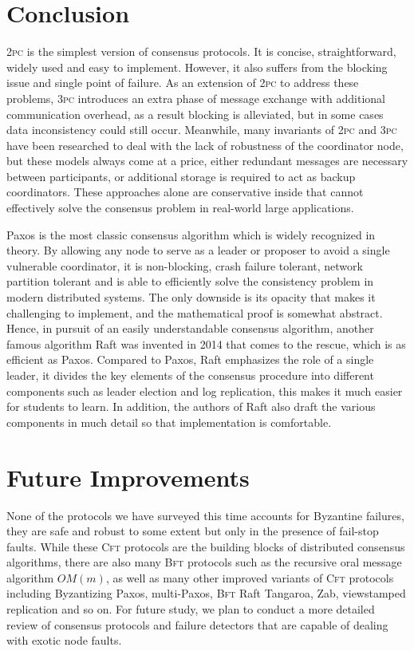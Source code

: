 \documentclass[11pt]{article}
\begin{document}
  \section{Conclusion}
    \textsc{2pc} is the simplest version of consensus protocols. It is concise, straightforward, widely used and easy to implement. However, it also suffers from the blocking issue and single point of failure. As an extension of \textsc{2pc} to address these problems, \textsc{3pc} introduces an extra phase of message exchange with additional communication overhead, as a result blocking is alleviated, but in some cases data inconsistency could still occur. Meanwhile, many invariants of \textsc{2pc} and \textsc{3pc} have been researched to deal with the lack of robustness of the coordinator node, but these models always come at a price, either redundant messages are necessary between participants, or additional storage is required to act as backup coordinators. These approaches alone are conservative inside that cannot effectively solve the consensus problem in real-world large applications.

    Paxos is the most classic consensus algorithm which is widely recognized in theory. By allowing any node to serve as a leader or proposer to avoid a single vulnerable coordinator, it is non-blocking, crash failure tolerant, network partition tolerant and is able to efficiently solve the consistency problem in modern distributed systems. The only downside is its opacity that makes it challenging to implement, and the mathematical proof is somewhat abstract. Hence, in pursuit of an easily understandable consensus algorithm, another famous algorithm Raft was invented in 2014 that comes to the rescue, which is as efficient as Paxos. Compared to Paxos, Raft emphasizes the role of a single leader, it divides the key elements of the consensus procedure into different components such as leader election and log replication, this makes it much easier for students to learn. In addition, the authors of Raft also draft the various components in much detail so that implementation is comfortable.

  \section{Future Improvements}
    None of the protocols we have surveyed this time accounts for Byzantine failures, they are safe and robust to some extent but only in the presence of fail-stop faults. While these \textsc{Cft} protocols are the building blocks of distributed consensus algorithms, there are also many \textsc{Bft} protocols such as the recursive oral message algorithm $OM(m)$\autocite{bft}, as well as many other improved variants of \textsc{Cft} protocols including Byzantizing Paxos, multi-Paxos, \textsc{Bft} Raft Tangaroa, Zab, viewstamped replication and so on. For future study, we plan to conduct a more detailed review of consensus protocols and failure detectors that are capable of dealing with exotic node faults.


  \vspace{8mm}
  \printbibliography

  \vfill
  \doclicenseThis
\end{document}
